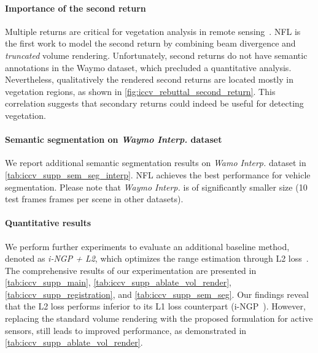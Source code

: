 \paragraph{Importance of the second return}
Multiple returns are critical for vegetation analysis in remote sensing~\cite{lim2003lidar}. NFL is the first work to model the second return by combining beam divergence and \textit{truncated} volume rendering. Unfortunately, second returns do not have semantic annotations in the Waymo dataset, which precluded a quantitative analysis. Nevertheless, qualitatively the rendered second returns are located mostly in vegetation regions, as shown in \cref{fig:iccv_rebuttal_second_return}. This correlation suggests that secondary returns could indeed be useful for detecting vegetation. 


\paragraph{Semantic segmentation on \textit{Waymo Interp.} dataset}
We report additional semantic segmentation results on \textit{Wamo Interp.} dataset in \cref{tab:iccv_supp_sem_seg_interp}. NFL achieves the best performance for vehicle segmentation. Please note that \textit{Waymo Interp.} is of significantly smaller size (10 test frames  frames per scene in other datasets).






\paragraph{Quantitative results}
We perform further experiments to evaluate an additional baseline method, denoted as \textit{i-NGP\cite{mueller2022instant} + L2}, which optimizes the range estimation through L2 loss~\cite{deng2021depth,rematas2021urban}. The comprehensive results of our experimentation are presented in \cref{tab:iccv_supp_main}, \cref{tab:iccv_supp_ablate_vol_render}, \cref{tab:iccv_supp_registration}, and \cref{tab:iccv_supp_sem_seg}. Our findings reveal that the L2 loss performs inferior to its L1 loss counterpart (\ie i-NGP~\cite{mueller2022instant}). However, replacing the standard volume rendering with the proposed formulation for active sensors, still leads to improved performance, as demonstrated in \cref{tab:iccv_supp_ablate_vol_render}.

